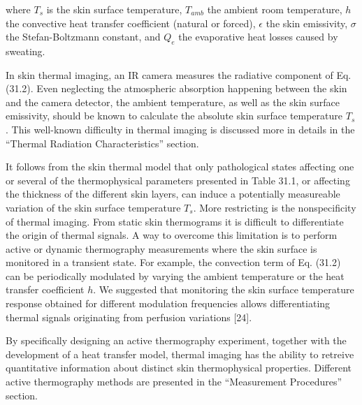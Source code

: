where $T_s$ is the skin surface temperature, $T_{amb}$ the ambient room
temperature, $h$ the convective heat transfer coefficient (natural or forced),
$\epsilon$ the skin emissivity, $\sigma$ the Stefan-Boltzmann constant, and
$Q_e$ the evaporative heat losses caused by sweating.

In skin thermal imaging, an IR camera measures the radiative component of
Eq. (31.2). Even neglecting the atmospheric absorption happening between the
skin and the camera detector, the ambient temperature, as well as the skin
surface emissivity, should be known to calculate the absolute skin surface
temperature $T_s$. This well-known difficulty in thermal imaging is discussed
more in details in the ``Thermal Radiation Characteristics'' section.

It follows from the skin thermal model that only pathological states affecting
one or several of the thermophysical parameters presented in Table 31.1, or
affecting the thickness of the different skin layers, can induce a potentially
measureable variation of the skin surface temperature $T_s$. More restricting is
the nonspecificity of thermal imaging. From static skin thermograms it is difficult
to differentiate the origin of thermal signals. A way to overcome this limitation
is to perform active or dynamic thermography measurements where the skin surface
is monitored in a transient state. For example, the convection term of Eq. (31.2)
can be periodically modulated by varying the ambient temperature or the heat
transfer coefficient $h$. We suggested that monitoring the skin surface temperature
response obtained for different modulation frequencies allows differentiating
thermal signals originating from perfusion variations [24].

By specifically designing an active thermography experiment, together with the
development of a heat transfer model, thermal imaging has the ability to retreive
quantitative information about distinct skin thermophysical properties. Different
active thermography methods are presented in the ``Measurement Procedures'' section.

